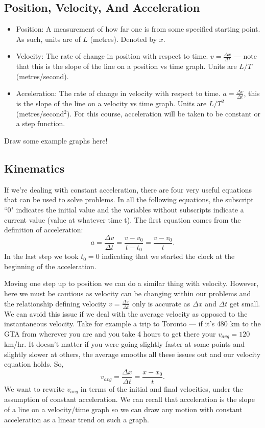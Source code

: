 \documentclass[letterpaper,12pt]{article}
\begin{document}
\subsection{Position, Velocity, And Acceleration}\label{sec:position}
\begin{itemize}
\item Position: A measurement of how far one is from some specified starting point. As such, units are of $L$ (metres). Denoted by $x$.
\item Velocity: The rate of change in position with respect to time. $v = \frac{\Delta x}{\Delta t}$ --- note that this is the slope of the line on a position vs time graph. Units are $L/T$ (metres/second).
\item Acceleration: The rate of change in velocity with respect to time. $a = \frac{\Delta v}{\Delta t}$, this is the slope of the line on a velocity vs time graph. Units are $L/T^2$ (metres/second$^2$). For this course, acceleration will be taken to be constant or a step function.
\end{itemize}
Draw some example graphs here!
\subsection{Kinematics}\label{sec:kinematics}

If we're dealing with constant acceleration, there are four very useful equations that can be used to solve problems. In all the following equations, the subscript ``0" indicates the initial value and the variables without subscripts indicate a current value (value at whatever time t). The first equation comes from the definition of acceleration:
\begin{equation}\label{eqn:kinAcc}
a = \frac{\Delta v}{\Delta t} = \frac{v-v_0}{t-t_0}=\frac{v-v_0}{t}.
\end{equation}
In the last step we took $t_0 = 0$ indicating that we started the clock at the beginning of the acceleration.

Moving one step up to position we can do a similar thing with velocity. However, here we must be cautious as velocity can be changing within our problems and the relationship defining velocity $v = \frac{\Delta x}{\Delta t}$ only is accurate as $\Delta x$ and $\Delta t$ get small. We can avoid this issue if we deal with the average velocity as opposed to the instantaneous velocity. Take for example a trip to Toronto --- if it's 480 km to the GTA from wherever you are and you take 4 hours to get there your $v_{avg} = 120$ km/hr. It doesn't matter if you were going slightly faster at some points and slightly slower at others, the average smooths all these issues out and our velocity equation holds. So,
\begin{equation}\label{eqn:kinVelSub1}
v_{avg} = \frac{\Delta x}{\Delta t} = \frac{x - x_0}{t}.
\end{equation}
We want to rewrite $v_{avg}$ in terms of the initial and final velocities, under the assumption of constant acceleration. We can recall that acceleration is the slope of a line on a velocity/time graph so we can draw any motion with constant acceleration as a linear trend on such a graph. 
\end{document}
